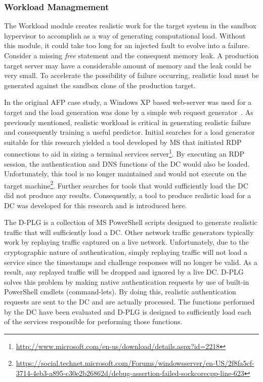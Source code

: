\tabFaults
\tabTranslationThirtyTwo
\tabTranslationSixtyFour

\subsubsection{Workload Managmement} \label{sec:workloadMgr} 
The Workload module creates realistic work for the target system in the sandbox
hypervisor to accomplish as a way of generating computational load.  Without
this module, it could take too long for an injected fault to evolve into a
failure.  Consider a missing \emph{free} statement and the consequent memory
leak.  A production target server may have a considerable amount of memory and
the leak could be very small.  To accelerate the possibility of failure
occurring, realistic load must be generated against the sandbox clone of the
production target.

In the original \ac{AFP} case study, a Windows XP based web-server was used for
a target and the load generation was done by a simple web request
generator~\cite{irrera2015}.  As previously mentioned, realistic workload is
critical in generating realistic failure and consequently training a useful
predictor.  Initial searches for a load generator suitable for this research
yielded a tool developed by \ac{MS} that initiated \ac{RDP} connections
to aid in sizing a terminal services
server\footnote{\url{http://www.microsoft.com/en-us/download/details.aspx?id=2218}}.
By executing an \ac{RDP} session, the authentication and \ac{DNS}
functions of the \ac{DC} would also be loaded.  Unfortunately, this tool is no
longer maintained and would not execute on the target
machine\footnote{\url{https://social.technet.microsoft.com/Forums/windowsserver/en-US/2f8fa5cf-3714-4eb3-a895-c30e2b26862d/debug-assertion-failed-sockcorecpp-line-623}}.
Further searches for tools that would sufficiently load the \ac{DC} did not
produce any results.  Consequently, a tool to produce realistic load for a
\ac{DC} was developed for this research and is introduced here.

The \ac{D-PLG} is a collection of \ac{MS} PowerShell scripts designed to
generate realistic traffic that will sufficiently load a \ac{DC}.  Other
network traffic generators typically work by replaying traffic captured on a
live network.  Unfortunately, due to the cryptographic nature of
authentication, simply replaying traffic will not load a service since the
timestamps and challenge responses will no longer be valid.  As a result, any
replayed traffic will be dropped and ignored by a live \ac{DC}.  \ac{D-PLG}
solves this problem by making native authentication requests by use of built-in
PowerShell cmdlets (command-lets).  By doing this, realistic authentication
requests are sent to the \ac{DC} and are actually processed.  The functions
performed by the \ac{DC} have been evaluated and \ac{D-PLG} is designed to
sufficiently load each of the services responsible for performing those
functions.

